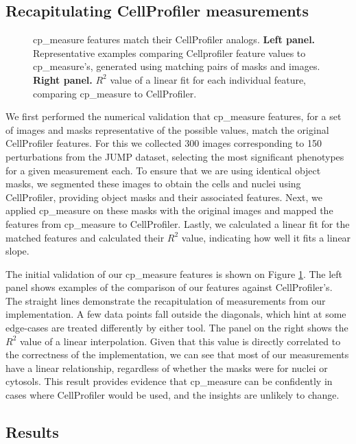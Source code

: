 \documentclass{article}
\begin{document}
\subsection{Recapitulating CellProfiler measurements}
\label{sec:org09b0cd2}

\begin{figure}[htbp]
\centering

\caption{\label{fig:cp_vs_cpmeasure}cp\_measure features match their CellProfiler analogs. \textbf{Left panel.} Representative examples comparing Cellprofiler feature values to cp\_measure's, generated using matching pairs of masks and images. \textbf{Right panel.} \(R^2\) value of a linear fit for each individual feature, comparing cp\_measure to CellProfiler.}
\end{figure}

We first performed the numerical validation that cp\_measure features, for a set of images and masks representative of the possible values, match the original CellProfiler features. For this we collected 300 images corresponding to 150 perturbations from the JUMP dataset, selecting the most significant phenotypes for a given measurement each. To ensure that we are using identical object masks, we segmented these images to obtain the cells and nuclei using CellProfiler, providing object masks and their associated features. Next, we applied cp\_measure on these masks with the original images and mapped the features from cp\_measure to CellProfiler. Lastly, we calculated a linear fit for the matched features and calculated their \(R^2\) value, indicating how well it fits a linear slope.

The initial validation of our cp\_measure features is shown on Figure \ref{fig:cp_vs_cpmeasure}. The left panel shows examples of the comparison of our features against CellProfiler's. The straight lines demonstrate the recapitulation of measurements from our implementation. A few data points fall outside the diagonals, which hint at some edge-cases are treated differently by either tool. The panel on the right shows the \(R^2\) value of a linear interpolation. Given that this value is directly correlated to the correctness of the implementation, we can see that most of our measurements have a linear relationship, regardless of whether the masks were for nuclei or cytosols. This result provides evidence that cp\_measure can be confidently in cases where CellProfiler would be used, and the insights are unlikely to change.
\subsection{Results}
\label{sec:orge5b5c6b}
\end{document}
